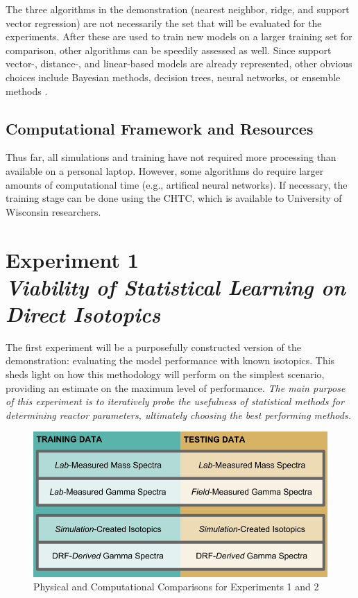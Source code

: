 The three algorithms in the demonstration (nearest neighbor, ridge, and support
vector regression) are not necessarily the set that will be evaluated for the
experiments. After these are used to train new models on a larger training set
for comparison, other algorithms can be speedily assessed as well.  Since
support vector-, distance-, and linear-based models are already represented,
other obvious choices include Bayesian methods, decision trees, neural
networks, or ensemble methods \cite{elements_stats}. 

\subsection*{Computational Framework and Resources}

Thus far, all simulations and training have not required more processing than
available on a personal laptop. However, some algorithms do require larger
amounts of computational time (e.g., artifical neural networks).  If necessary,
the training stage can be done using the \gls{CHTC}, which is available to
University of Wisconsin researchers. 

\section[Experiment 1: Direct Isotopics]{Experiment 1\\ 
\large{\textit{Viability of Statistical Learning on Direct Isotopics}}}
\label{sec:exp1}

The first experiment will be a purposefully constructed version of the
demonstration: evaluating the model performance with known isotopics.  This
sheds light on how this methodology will perform on the simplest scenario,
providing an estimate on the maximum level of performance.  \textit{The main
purpose of this experiment is to iteratively probe the usefulness of
statistical methods for determining reactor parameters, ultimately choosing the 
best performing methods.}
\\
\begin{figure}[!htb]
    \centering
    \includegraphics[width=\linewidth]{./chapters/proposal/proposal.png}
    \caption{Physical and Computational Comparisons for Experiments 1 and 2}
    \label{fig:proposal}
\end{figure}

